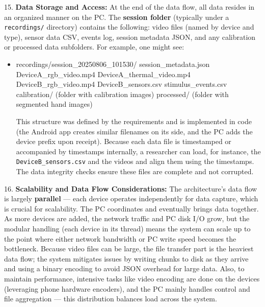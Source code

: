 15. \textbf{Data Storage and Access:} At the end of the data flow, all data
    resides in an organized manner on the PC. The \textbf{session folder}
    (typically under a \texttt{recordings/} directory) contains the following:
    video files (named by device and type), sensor data CSV, events log,
    session metadata JSON, and any calibration or processed data
    subfolders. For example, one might see:

\begin{itemize}
\item recordings/session_20250806_101530/
        session_metadata.json
        DeviceA_rgb_video.mp4
        DeviceA_thermal_video.mp4
        DeviceB_rgb_video.mp4
        DeviceB_sensors.csv
        stimulus_events.csv
        calibration/ (folder with calibration images)
        processed/ (folder with segmented hand images)

  This structure was defined by the requirements and is implemented in
  code (the Android app creates similar filenames on its
  side\cite{SessionManagerKt},
  and the PC adds the device prefix upon receipt). Because each data
  file is timestamped or accompanied by timestamps internally, a
  researcher can load, for instance, the \texttt{DeviceB\_sensors.csv} and the
  videos and align them using the timestamps. The data integrity checks
  ensure these files are complete and not corrupted.

\end{itemize}
16. \textbf{Scalability and Data Flow Considerations:} The architecture's
    data flow is largely \textbf{parallel} --- each device operates
    independently for data capture, which is crucial for scalability.
    The PC coordinates and eventually brings data together. As more
    devices are added, the network traffic and PC disk I/O grow, but the
    modular handling (each device in its thread) means the system can
    scale up to the point where either network bandwidth or PC write
    speed becomes the bottleneck. Because video files can be large, the
    file transfer part is the heaviest data flow; the system mitigates
    issues by writing chunks to disk as they arrive and using a binary
    encoding to avoid JSON overhead for large
    data\cite{DeviceServer}.
    Also, to maintain performance, intensive tasks like video encoding
    are done on the devices (leveraging phone hardware encoders), and
    the PC mainly handles control and file aggregation --- this
    distribution balances load across the system.

